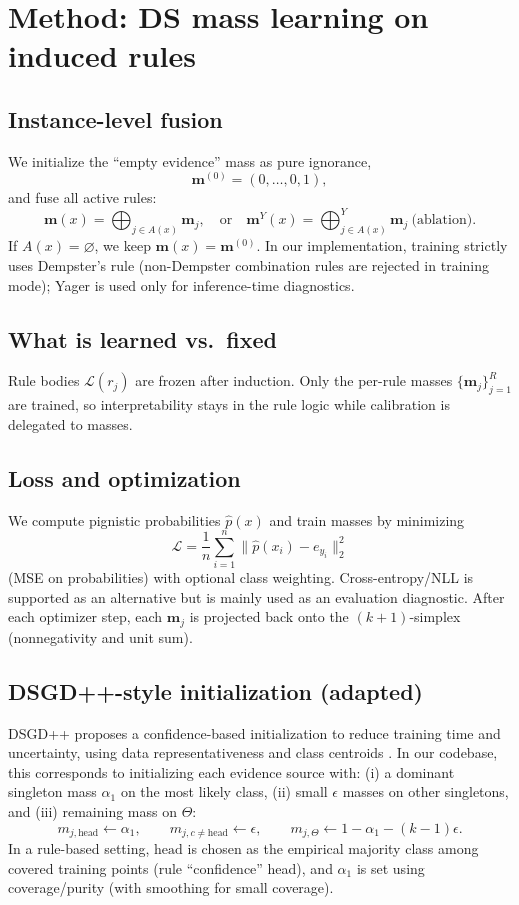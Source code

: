 \documentclass[11pt,a4paper]{article}
\providecommand{\mb}[1]{#1}
\renewcommand{\mb}[1]{\bm{#1}}
\providecommand{\mc}[1]{#1}
\renewcommand{\mc}[1]{\mathcal{#1}}
\providecommand{\1}{}
\renewcommand{\1}{\mathbbm{1}}
\begin{document}
\section{Method: DS mass learning on induced rules}

\subsection{Instance-level fusion}
We initialize the ``empty evidence'' mass as pure ignorance,
\[
\mb{m}^{(0)}=(0,\dots,0,1),
\]
and fuse all active rules:
\[
\mb{m}(x)=\bigoplus_{j\in A(x)} \mb{m}_j,
\quad\text{or}\quad
\mb{m}^{Y}(x)=\bigoplus\nolimits^{Y}_{j\in A(x)} \mb{m}_j\ \text{(ablation)}.
\]
If $A(x)=\varnothing$, we keep $\mb{m}(x)=\mb{m}^{(0)}$.
In our implementation, training strictly uses Dempster's rule (non-Dempster combination rules are rejected in training mode); Yager is used only for inference-time diagnostics.

\subsection{What is learned vs.\ fixed}
Rule bodies $\mc{L}(r_j)$ are frozen after induction.
Only the per-rule masses $\{\mb{m}_j\}_{j=1}^R$ are trained, so interpretability stays in the rule logic while calibration is delegated to masses.

\subsection{Loss and optimization}
We compute pignistic probabilities $\hat p(x)$ and train masses by minimizing
\[
\mc{L} = \frac{1}{n}\sum_{i=1}^n \|\hat p(x_i)-e_{y_i}\|_2^2
\]
(MSE on probabilities) with optional class weighting. Cross-entropy/NLL is supported as an alternative but is mainly used as an evaluation diagnostic.
After each optimizer step, each $\mb{m}_j$ is projected back onto the $(k+1)$-simplex (nonnegativity and unit sum).

\subsection{DSGD++-style initialization (adapted)}
DSGD++ proposes a confidence-based initialization to reduce training time and uncertainty, using data representativeness and class centroids \cite{Tarkhanyan2025}.
In our codebase, this corresponds to initializing each evidence source with:
(i) a dominant singleton mass $\alpha_1$ on the most likely class,
(ii) small $\epsilon$ masses on other singletons, and
(iii) remaining mass on $\Theta$:
\[
m_{j,\mathrm{head}} \leftarrow \alpha_1,\qquad
m_{j,c\neq \mathrm{head}} \leftarrow \epsilon,\qquad
m_{j,\Theta}\leftarrow 1-\alpha_1-(k-1)\epsilon.
\]
In a rule-based setting, $\mathrm{head}$ is chosen as the empirical majority class among covered training points (rule ``confidence'' head), and $\alpha_1$ is set using coverage/purity (with smoothing for small coverage).
\end{document}

